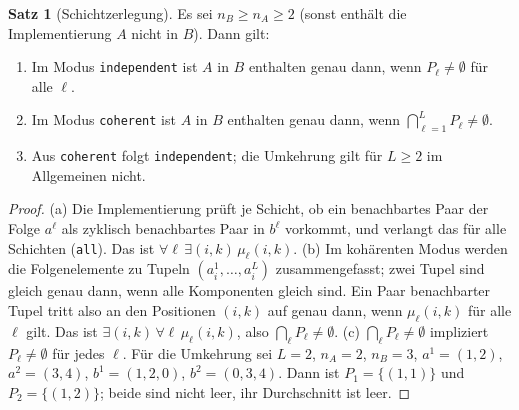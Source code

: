 \documentclass[a4paper,12pt, twoside]{report}
\theoremstyle{definition}
\newtheorem{satz}{Satz}
\begin{document}
\begin{satz}[Schichtzerlegung]
\label{satz:p910_schicht}
Es sei $n_B\ge n_A\ge 2$ (sonst enthält die Implementierung $A$ nicht in $B$). Dann gilt:
\begin{enumerate}[label=(\alph*)]
\item Im Modus \texttt{independent} ist $A$ in $B$ enthalten genau dann, wenn $P_\ell\ne\emptyset$ für alle $\ell$.
\item Im Modus \texttt{coherent} ist $A$ in $B$ enthalten genau dann, wenn $\bigcap_{\ell=1}^LP_\ell\ne\emptyset$.
\item Aus \texttt{coherent} folgt \texttt{independent}; die Umkehrung gilt für $L\ge 2$ im Allgemeinen nicht.
\end{enumerate}
\end{satz}

\begin{proof}
(a) Die Implementierung prüft je Schicht, ob ein benachbartes Paar der Folge $a^\ell$ als zyklisch benachbartes Paar in $b^\ell$ vorkommt, und verlangt das für alle Schichten (\texttt{all}). Das ist $\forall\ell\,\exists(i,k)\,\mu_\ell(i,k)$.
(b) Im kohärenten Modus werden die Folgenelemente zu Tupeln $(a^1_i,\dots,a^L_i)$ zusammengefasst; zwei Tupel sind gleich genau dann, wenn alle Komponenten gleich sind. Ein Paar benachbarter Tupel tritt also an den Positionen $(i,k)$ auf genau dann, wenn $\mu_\ell(i,k)$ für alle $\ell$ gilt. Das ist $\exists(i,k)\,\forall\ell\,\mu_\ell(i,k)$, also $\bigcap_\ell P_\ell\ne\emptyset$.
(c) $\bigcap_\ell P_\ell\ne\emptyset$ impliziert $P_\ell\ne\emptyset$ für jedes $\ell$. Für die Umkehrung sei $L=2$, $n_A=2$, $n_B=3$, $a^1=(1,2)$, $a^2=(3,4)$, $b^1=(1,2,0)$, $b^2=(0,3,4)$. Dann ist $P_1=\{(1,1)\}$ und $P_2=\{(1,2)\}$; beide sind nicht leer, ihr Durchschnitt ist leer.
\end{proof}
\end{document}
